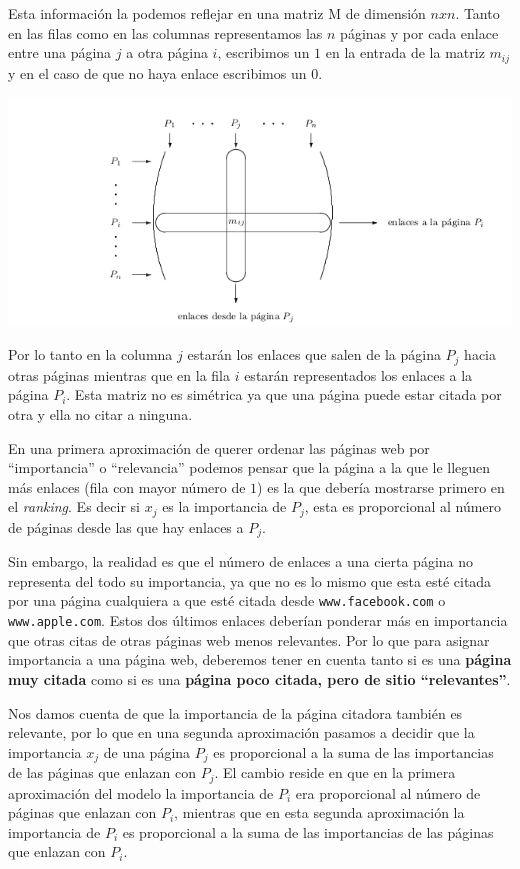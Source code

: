 \documentclass[size=a4, parskip=half, titlepage=false, toc=flat, toc=bib, 12pt]{scrartcl}
\theoremstyle{theorem-style}
\theoremstyle{definition-style}
\theoremstyle{remark-style}
\theoremstyle{example-style}
\theoremstyle{definition-style}
\theoremstyle{remark-style}
\begin{document}
Esta información la podemos reflejar en una matriz M de dimensión $nxn$. Tanto en las filas como en las columnas representamos las $n$ páginas y por cada enlace entre una página $j$ a otra página $i$, escribimos un $1$ en la entrada de la
matriz $m_{ij}$ y en el caso de que no haya enlace escribimos un $0$.

\includegraphics[width=1.0\textwidth]{./img/matriz}

Por lo tanto en la columna $j$ estarán los enlaces que salen de la página $P_j$ hacia otras páginas
mientras que en la fila $i$ estarán representados los enlaces a la página $P_i$. Esta matriz
no es simétrica ya que una página puede estar citada por otra y ella no citar a ninguna.

En una primera aproximación de querer ordenar las páginas web por ``importancia'' o ``relevancia'' podemos pensar que la página a la que le lleguen más enlaces (fila con mayor número de $1$) es la que debería mostrarse primero en el \textit{ranking}. Es decir si $x_j$ es la importancia de $P_j$, esta es proporcional al número de páginas desde las que hay enlaces a $P_j$.

Sin embargo, la realidad es que el número de enlaces a una cierta página no representa del todo su importancia, ya que no es lo mismo que esta esté citada por una página cualquiera a que esté citada desde \verb|www.facebook.com| o \verb|www.apple.com|. Estos dos últimos enlaces deberían ponderar más en importancia que otras citas de otras páginas web menos relevantes. Por lo que para asignar importancia a una página web, deberemos tener en cuenta tanto si es una \textbf{página muy citada} como si es una \textbf{página poco citada, pero de sitio ``relevantes''}.

Nos damos cuenta de que la importancia de la página citadora también es relevante, por lo que en una segunda aproximación pasamos a decidir que la importancia $x_j$ de una página $P_j$ es proporcional a la suma de las importancias de las páginas que enlazan con $P_j$. El cambio reside en que en la primera aproximación del modelo la importancia de $P_i$ era proporcional al número de páginas que enlazan con $P_i$, mientras que en esta segunda aproximación la importancia de $P_i$ es proporcional a la suma de las importancias de las páginas que enlazan con $P_i$.
\end{document}
